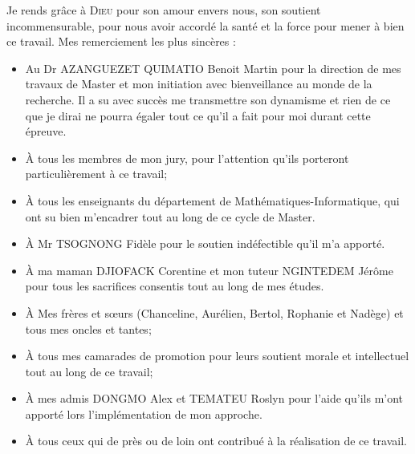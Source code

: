 Je rends grâce à \textsc{Dieu} pour son amour envers nous, son soutient incommensurable, pour nous avoir accordé la santé et la force pour mener à bien ce travail. Mes remerciement les plus sincères :
\begin{itemize}
\item Au Dr AZANGUEZET QUIMATIO Benoit Martin pour la direction de mes travaux de Master
et mon initiation avec bienveillance au monde de la recherche. Il a su avec succès me transmettre son dynamisme et rien de ce que je dirai ne pourra égaler tout ce qu'il a fait pour moi durant cette épreuve.
\item \`{A} tous les membres de mon jury, pour l'attention qu'ils porteront particulièrement à ce travail;
\item \`{A} tous les enseignants du département de Mathématiques-Informatique, qui ont su bien m'encadrer tout au long de ce cycle de Master.
\item \`{A} Mr TSOGNONG Fidèle pour le soutien indéfectible qu'il m'a apporté.
\item \`{A} ma maman DJIOFACK Corentine et mon tuteur NGINTEDEM Jérôme pour tous les sacrifices consentis tout au long de mes études.
\item \`{A} Mes frères et sœurs (Chanceline, Aurélien, Bertol, Rophanie et Nadège) et tous mes oncles et tantes;
\item \`{A} tous mes camarades de promotion pour leurs soutient morale et intellectuel tout au long de ce travail;
\item \`{A} mes admis DONGMO Alex et TEMATEU Roslyn pour l'aide qu'ils m'ont apporté lors l'implémentation de mon approche.
\item \`{A} tous ceux qui de près ou de loin ont contribué à la réalisation de ce travail.
\end{itemize}

\myCleanStarChapterEnd
